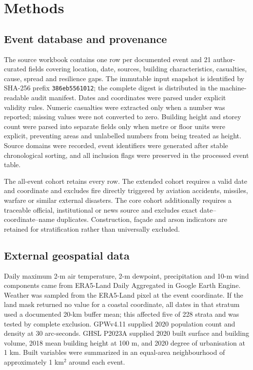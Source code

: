 \documentclass[11pt]{article}
\begin{document}
\section*{Methods}
\subsection*{Event database and provenance}
The source workbook contains one row per documented event and 21 author-curated fields covering location, date, sources, building characteristics, casualties, cause, spread and resilience gaps. The immutable input snapshot is identified by SHA-256 prefix \texttt{386eb5561012}; the complete digest is distributed in the machine-readable audit manifest. Dates and coordinates were parsed under explicit validity rules. Numeric casualties were extracted only when a number was reported; missing values were not converted to zero. Building height and storey count were parsed into separate fields only when metre or floor units were explicit, preventing areas and unlabelled numbers from being treated as height. Source domains were recorded, event identifiers were generated after stable chronological sorting, and all inclusion flags were preserved in the processed event table.

The all-event cohort retains every row. The extended cohort requires a valid date and coordinate and excludes fire directly triggered by aviation accidents, missiles, warfare or similar external disasters. The core cohort additionally requires a traceable official, institutional or news source and excludes exact date--coordinate--name duplicates. Construction, façade and arson indicators are retained for stratification rather than universally excluded.

\subsection*{External geospatial data}
Daily maximum 2-m air temperature, 2-m dewpoint, precipitation and 10-m wind components came from ERA5-Land Daily Aggregated in Google Earth Engine\citep{MunozSabater2021}. Weather was sampled from the ERA5-Land pixel at the event coordinate. If the land mask returned no value for a coastal coordinate, all dates in that stratum used a documented 20-km buffer mean; this affected five of 228 strata and was tested by complete exclusion. GPWv4.11 supplied 2020 population count and density at 30 arc-seconds\citep{GPW2020}. GHSL P2023A supplied 2020 built surface and building volume, 2018 mean building height at 100 m, and 2020 degree of urbanisation at 1 km\citep{GHSL2023}. Built variables were summarized in an equal-area neighbourhood of approximately 1 km$^2$ around each event.
\end{document}
